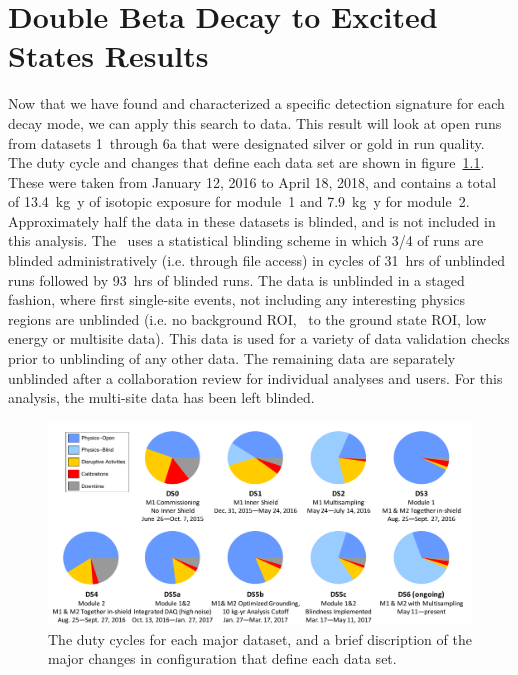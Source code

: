 \documentclass[/main.tex]{subfiles}
\begin{document}
\onlyinsubfile{\textpages}
\chapter{Double Beta Decay to Excited States Results}
Now that we have found and characterized a specific detection signature for each decay mode, we can apply this search to data.
This result will look at open runs from datasets 1~through 6a that were designated silver or gold in run quality.
The duty cycle and changes that define each data set are shown in figure~\ref{fig:dutycycle}.
These were taken from January 12, 2016 to April 18, 2018, and contains a total of 13.4~kg~y of isotopic exposure for module~1 and 7.9~kg~y for module~2.
Approximately half the data in these datasets is blinded, and is not included in this analysis.
The \MJD\ uses a statistical blinding scheme in which 3/4 of runs are blinded administratively (i.e. through file access) in cycles of 31~hrs of unblinded runs followed by 93~hrs of blinded runs.
The data is unblinded in a staged fashion, where first single-site events, not including any interesting physics regions are unblinded (i.e. no background ROI, \znbb\ to the ground state ROI, low energy or multisite data).
This data is used for a variety of data validation checks prior to unblinding of any other data.
The remaining data are separately unblinded after a collaboration review for individual analyses and users.
For this analysis, the multi-site data has been left blinded.
\\
\begin{figure}[h]
  \centering
  \includegraphics[width=0.9\linewidth]{dutycycle}
  \caption[Dataset and Duty Cycle Summary]{\label{fig:dutycycle}
    The duty cycles for each major dataset, and a brief discription of the major changes in configuration that define each data set.
  }
\end{figure}
\end{document}
